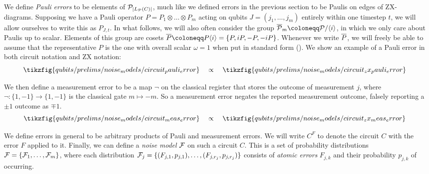 We define \textit{Pauli errors} to be elements of $\mathcal{P}_{|L_{\mathcal{P}}(C)|}$, much like we defined errors in the previous section to be Paulis on edges of ZX-diagrams.
Supposing we have a Pauli operator $P = P_1 \otimes \ldots \otimes P_m$ acting on qubits $J = (j_1, \ldots, j_m)$ entirely within one timestep $t$, we will allow ourselves to write this as $P_{J, t}$.
In what follows, we will also often consider the group $\ol{\PPP}_{m} \coloneqq \PPP/\pres{i}$, in which we only care about Paulis up to scalar.
Elements of this group are cosets $\ol{P} \coloneqq P\pres{i} = \{P, iP, -P, -iP\}$.
Whenever we write $\overline{P}$, we will freely be able to assume that the representative $P$ is the one with overall scalar $\omega = 1$ when put in standard form ().
We show an example of a Pauli error in both circuit notation and ZX notation:
\begin{equation}
    \tikzfig{qubits/prelims/noise_models/circuit_pauli_error}
    \quad \propto \quad
    \tikzfig{qubits/prelims/noise_models/circuit_zx_pauli_error}
\end{equation}

We then define a measurement error to be a map $\neg$ on the classical register that stores the outcome of measurement $j$, where $\neg: \{1, -1\} \to \{1, -1\}$ is the classical gate $m \mapsto -m$.
So a measurement error negates the reported measurement outcome, falsely reporting a $\pm 1$ outcome as $\mp 1$.
\begin{equation}
    \tikzfig{qubits/prelims/noise_models/circuit_meas_error}
    \quad \propto \quad
    \tikzfig{qubits/prelims/noise_models/circuit_zx_meas_error}
\end{equation}

We define errors in general to be arbitrary products of Pauli and measurement errors.
We will write $C^F$ to denote the circuit $C$ with the error $F$ applied to it.
Finally, we can define a \textit{noise model} $\mathcal{F}$ on such a circuit $C$.
This is a set of probability distributions $\mathcal{F} = \{\mathcal{F}_1, \ldots, \mathcal{F}_m\}$, where each distribution $\mathcal{F}_j = \{(F_{j,1}, p_{j,1}), \ldots, (F_{j,r_j}, p_{j,r_j})\}$ consists of \textit{atomic errors} $F_{j,k}$ and their probability $p_{j,k}$ of occurring.



